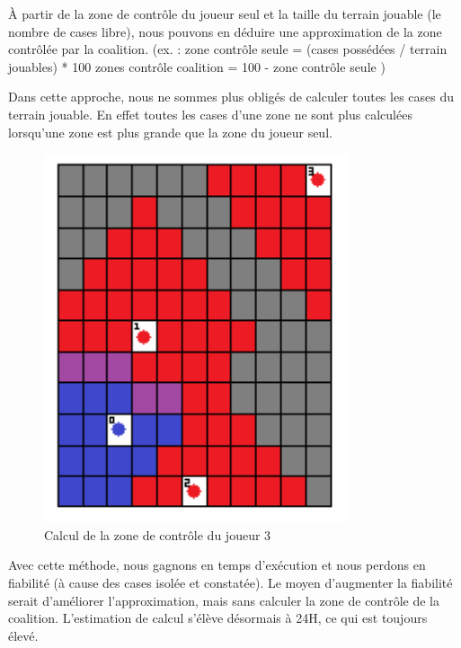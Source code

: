 À partir de la zone de contrôle du joueur seul et la taille du
terrain jouable (le nombre de cases libre), nous pouvons en déduire une
approximation de la zone contrôlée par la coalition.
(ex. : 	
zone contrôle seule = (cases possédées / terrain jouables) * 100
zones contrôle coalition = 100 - zone contrôle seule
)

\begin{info}
	Dans cette approche, nous ne sommes plus obligés de calculer toutes
	les cases du terrain jouable. En effet toutes les cases d'une zone ne sont
	plus calculées lorsqu'une zone est plus grande que la zone du joueur seul.
\end{info}

\begin{figure}[H]
	\centering
	\includegraphics[width=0.8\textwidth, keepaspectratio, height=0.25\textheight]{./pics/heuristique_interruption.png}	
	\caption{Calcul de la zone de contrôle du joueur 3}
\end{figure}

Avec cette méthode, nous gagnons en temps d'exécution et nous
perdons en fiabilité (à cause des cases isolée et constatée). Le moyen
d'augmenter la fiabilité serait d'améliorer l'approximation, mais sans
calculer la zone de contrôle de la coalition. L'estimation de calcul
s'élève désormais à 24H, ce qui est toujours élevé.

